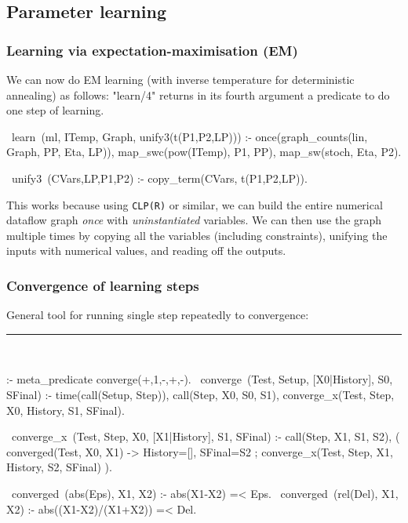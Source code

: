 \documentclass[usenames,dvipsnames]{beamer}
\newenvironment{isframe}[1][untitled]{\begin{frame}[fragile=singleslide,environment=isframe]\frametitle{#1}}{\end{frame}}
\def\pl#1{\lstinline[language={[SWI]Prolog},columns=fullflexible]{#1}}
\begin{document}
\subsection{Parameter learning}

\begin{isframe}[Learning via expectation-maximisation (EM)]
We can now do EM learning (with
inverse temperature for deterministic annealing) as follows:
"learn/4" returns in its fourth argument a predicate to do one
step of learning.
\begin{prolog}[xleftmargin=0em,basicstyle=\small]
	~learn~(ml, ITemp, Graph, unify3(t(P1,P2,LP))) :-
		 once(graph_counts(lin, Graph, PP, Eta, LP)),
		 map_swc(pow(ITemp), P1, PP),
		 map_sw(stoch, Eta, P2).

	~unify3~(CVars,LP,P1,P2) :- copy_term(CVars, t(P1,P2,LP)).
\end{prolog}
This works because using \pl{CLP(R)} or similar, we can build the entire numerical dataflow graph
\emph{once} with \emph{uninstantiated} variables. We can then use the graph
multiple times by copying all the variables (including constraints), unifying the inputs with
numerical values, and reading off the outputs.
\end{isframe}

\begin{isframe}[Convergence of learning steps]
General tool for running single step repeatedly to convergence:
\rule{\linewidth}{0.4pt}\\
\begin{prolog}[xleftmargin=0em,basicstyle=\small]
	:- meta_predicate converge(+,1,-,+,-).
	~converge~(Test, Setup, [X0|History], S0, SFinal) :-
		 time(call(Setup, Step)),
		 call(Step, X0, S0, S1),
		 converge_x(Test, Step, X0, History, S1, SFinal).

	~converge_x~(Test, Step, X0, [X1|History], S1, SFinal) :-
		 call(Step, X1, S1, S2),
		 (  converged(Test, X0, X1) -> History=[], SFinal=S2
		 ;  converge_x(Test, Step, X1, History, S2, SFinal)
		 ).

	~converged~(abs(Eps), X1, X2) :- abs(X1-X2) =< Eps.
	~converged~(rel(Del), X1, X2) :- abs((X1-X2)/(X1+X2)) =< Del.
\end{prolog}
\end{isframe}
\end{document}
